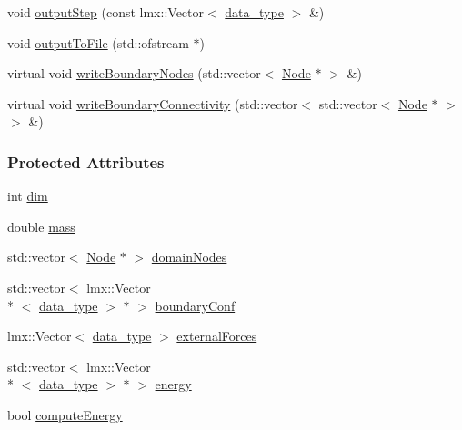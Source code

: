 \begin{DoxyCompactItemize}
\item 
void \hyperlink{classmknix_1_1_rigid_body_a605ed074fed7570c6620a6a6f6cd4bb0}{output\-Step} (const lmx\-::\-Vector$<$ \hyperlink{namespacemknix_a16be4b246fbf2cceb141e3a179111020}{data\-\_\-type} $>$ \&)
\item 
void \hyperlink{classmknix_1_1_rigid_body_a0b0df6ee53217187a301f224b8fe0d92}{output\-To\-File} (std\-::ofstream $\ast$)
\item 
virtual void \hyperlink{classmknix_1_1_rigid_body_ae58c1bff0a98afdd0f4174e1fabd7f0a}{write\-Boundary\-Nodes} (std\-::vector$<$ \hyperlink{classmknix_1_1_node}{Node} $\ast$ $>$ \&)
\item 
virtual void \hyperlink{classmknix_1_1_rigid_body_a60ad96e6110f259021c31568d3a3bcfb}{write\-Boundary\-Connectivity} (std\-::vector$<$ std\-::vector$<$ \hyperlink{classmknix_1_1_node}{Node} $\ast$ $>$ $>$ \&)
\end{DoxyCompactItemize}
\subsubsection*{Protected Attributes}
\begin{DoxyCompactItemize}
\item 
int \hyperlink{classmknix_1_1_rigid_body_abdb2cd12b0d4c08b6ba7a7c3fd84b2e2}{dim}
\item 
double \hyperlink{classmknix_1_1_rigid_body_af9643b668fbafd10ffd392b8aebdae5e}{mass}
\item 
std\-::vector$<$ \hyperlink{classmknix_1_1_node}{Node} $\ast$ $>$ \hyperlink{classmknix_1_1_rigid_body_a278b4b0d27aaecfae2be58c8a9275a8c}{domain\-Nodes}
\item 
std\-::vector$<$ lmx\-::\-Vector\\*
$<$ \hyperlink{namespacemknix_a16be4b246fbf2cceb141e3a179111020}{data\-\_\-type} $>$ $\ast$ $>$ \hyperlink{classmknix_1_1_rigid_body_a36a9d72e5203dc087748cb7fddafee71}{boundary\-Conf}
\item 
lmx\-::\-Vector$<$ \hyperlink{namespacemknix_a16be4b246fbf2cceb141e3a179111020}{data\-\_\-type} $>$ \hyperlink{classmknix_1_1_rigid_body_ab465103ed21d529c66733705ad5b588c}{external\-Forces}
\item 
std\-::vector$<$ lmx\-::\-Vector\\*
$<$ \hyperlink{namespacemknix_a16be4b246fbf2cceb141e3a179111020}{data\-\_\-type} $>$ $\ast$ $>$ \hyperlink{classmknix_1_1_rigid_body_a372052707d7e00a97db50ce6d323cdf3}{energy}
\item 
bool \hyperlink{classmknix_1_1_rigid_body_a569b96d28e2b0c008240a001c3a87eb3}{compute\-Energy}
\end{DoxyCompactItemize}


